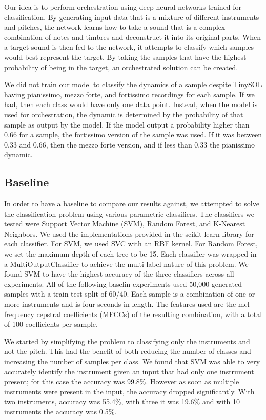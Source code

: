 \documentclass{article}
\begin{document}
Our idea is to perform orchestration using deep neural networks trained for classification. By generating input data that is a mixture of different instruments and pitches, the network learns how to take a sound that is a complex combination of notes and timbres and deconstruct it into its original parts. When a target sound is then fed to the network, it attempts to classify which samples would best represent the target. By taking the samples that have the highest probability of being in the target, an orchestrated solution can be created. 

We did not train our model to classify the dynamics of a sample despite TinySOL having pianissimo, mezzo forte, and fortissimo recordings for each sample. If we had, then each class would have only one data point. Instead, when the model is used for orchestration, the dynamic is determined by the probability of that sample as output by the model. If the model output a probability higher than $0.66$ for a sample, the fortissimo version of the sample was used. If it was between $0.33$ and $0.66$, then the mezzo forte version, and if less than $0.33$ the pianissimo dynamic.

\subsection{Baseline}
In order to have a baseline to compare our results against, we attempted to solve the classification problem using various parametric classifiers. The classifiers we tested were Support Vector Machine (SVM), Random Forest, and K-Nearest Neighbors. We used the implementations provided in the scikit-learn library for each classifier. For SVM, we used SVC with an RBF kernel. For Random Forest, we set the maximum depth of each tree to be 15. Each classifier was wrapped in a MultiOutputClassifier to achieve the multi-label nature of this problem. We found SVM to have the highest accuracy of the three classifiers across all experiments. All of the following baselin experiments used 50,000 generated samples with a train-test split of 60/40. Each sample is a combination of one or more instruments and is four seconds in length. The features used are the mel frequency cepstral coefficients (MFCCs) of the resulting combination, with a total of 100 coefficients per sample.

We started by simplifying the problem to classifying only the instruments and not the pitch. This had the benefit of both reducing the number of classes and increasing the number of samples per class. We found that SVM was able to very accurately identify the instrument given an input that had only one instrument present; for this case the accuracy was 99.8\%. However as soon as multiple instruments were present in the input, the accuracy dropped significantly. With two instruments, accuracy was 55.4\%, with three it was 19.6\% and with 10 instruments the accuracy was 0.5\%. 
\end{document}
